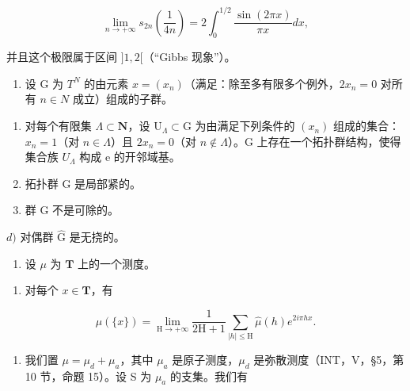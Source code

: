 \[
\lim _ {n \rightarrow + \infty} s _ {2 n} \left(\frac {1}{4 n}\right) = 2 \int_ {0} ^ {1 / 2} \frac {\sin (2 \pi x)}{\pi x} d x,
\]

并且这个极限属于区间 \(]1,2[\)（“Gibbs 现象”）。

\begin{enumerate}
\def\labelenumi{\arabic{enumi})}
\setcounter{enumi}{62}
\tightlist
\item
  设 G 为 \(T^{N}\) 的由元素 \(x = (x_{n})\)（满足：除至多有限多个例外，\(2x_{n} = 0\) 对所有 \(n \in N\) 成立）组成的子群。
\end{enumerate}

\begin{enumerate}
\def\labelenumi{\alph{enumi})}
\item
  对每个有限集 \(\Lambda \subset \mathbf{N}\)，设 \(\mathrm{U}_{\Lambda} \subset \mathrm{G}\) 为由满足下列条件的 \((x_{n})\) 组成的集合：\(x_{n} = 1\)（对 \(n \in \Lambda\)）且 \(2x_{n} = 0\)（对 \(n \notin \Lambda\)）。G 上存在一个拓扑群结构，使得集合族 \(U_{\Lambda}\) 构成 e 的开邻域基。
\item
  拓扑群 G 是局部紧的。
\item
  群 G 不是可除的。
\end{enumerate}

\(d)\) 对偶群 \(\widehat{\mathrm{G}}\) 是无挠的。

\begin{enumerate}
\def\labelenumi{\arabic{enumi})}
\setcounter{enumi}{63}
\tightlist
\item
  设 \(\mu\) 为 \(\mathbf{T}\) 上的一个测度。
\end{enumerate}

\begin{enumerate}
\def\labelenumi{\alph{enumi})}
\tightlist
\item
  对每个 \(x \in \mathbf{T}\)，有
\end{enumerate}

\[
\mu (\{x \}) = \lim _ {\mathrm{H} \rightarrow + \infty} \frac {1}{2 \mathrm{H} + 1} \sum_ {| h | \leqslant \mathrm{H}} \widehat {\mu} (h) e ^ {2 i \pi h x}.
\]

\begin{enumerate}
\def\labelenumi{\alph{enumi})}
\setcounter{enumi}{1}
\tightlist
\item
  我们置 \(\mu = \mu_d + \mu_a\)，其中 \(\mu_a\) 是原子测度，\(\mu_d\) 是弥散测度（INT，V，§5，第 10 节，命题 15）。设 S 为 \(\mu_a\) 的支集。我们有
\end{enumerate}

